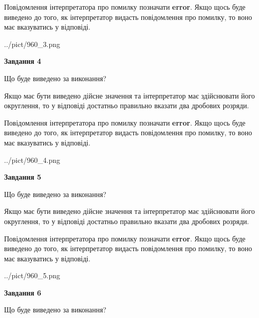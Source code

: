 \documentclass[12pt, ukrainian]{article}
\begin{document}
{\begin {Large}
Повідомлення інтерпретатора про помилку позначати \textbf{error}.
Якщо щось буде виведено до того, як інтерпретатор видасть повідомлення про помилку, 
то воно має вказуватись у відповіді. \par

\begin{center}
	{../pict/960_3.png}
\end{center}
\newpage

{\begin {center}\textbf{Завдання 4}\end {center}}\par
Що буде виведено за виконання? \par

Якщо має бути виведено дійсне значення та інтерпретатор має здійснювати його округлення, 
то у відповіді достатньо правильно вказати два дробових розряди.

Повідомлення інтерпретатора про помилку позначати \textbf{error}.
Якщо щось буде виведено до того, як інтерпретатор видасть повідомлення про помилку, 
то воно має вказуватись у відповіді. \par

\begin{center}
	{../pict/960_4.png}
\end{center}
\newpage

{\begin {center}\textbf{Завдання 5}\end {center}}\par
Що буде виведено за виконання? \par

Якщо має бути виведено дійсне значення та інтерпретатор має здійснювати його округлення, 
то у відповіді достатньо правильно вказати два дробових розряди.

Повідомлення інтерпретатора про помилку позначати \textbf{error}.
Якщо щось буде виведено до того, як інтерпретатор видасть повідомлення про помилку, 
то воно має вказуватись у відповіді. \par

\begin{center}
	{../pict/960_5.png}
\end{center}
\newpage

{\begin {center}\textbf{Завдання 6}\end {center}}\par
Що буде виведено за виконання? \par


\end{Large}}
\end{document}
